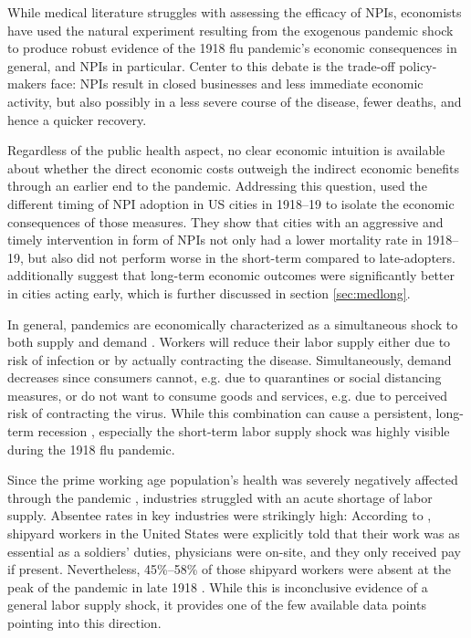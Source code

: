 \documentclass[12pt,a4paper]{article}
\begin{document}
While medical literature struggles with assessing the efficacy of NPIs, economists have used the natural experiment resulting from the exogenous pandemic shock to produce robust evidence of the 1918 flu pandemic's economic consequences in general, and NPIs in particular.
Center to this debate is the trade-off policy-makers face: NPIs result in closed businesses and less immediate economic activity, but also possibly in a less severe course of the disease, fewer deaths, and hence a quicker recovery.

Regardless of the public health aspect, no clear economic intuition is available about whether the direct economic costs outweigh the indirect economic benefits through an earlier end to the pandemic.
Addressing this question, \cite{correiaPandemicsDepressEconomy2020} used the different timing of NPI adoption in US cities in 1918--19 to isolate the economic consequences of those measures.
They show that cities with an aggressive and timely intervention in form of NPIs not only had a lower mortality rate in 1918--19, but also did not perform worse in the short-term compared to late-adopters.
\cite{correiaPandemicsDepressEconomy2020} additionally suggest that long-term economic outcomes were significantly better in cities acting early, which is further discussed in section \ref{sec:medlong}.

In general, pandemics are economically characterized as a simultaneous shock to both supply and demand \citep{eichenbaumMacroeconomicsEpidemics2020}.
Workers will reduce their labor supply either due to risk of infection or by actually contracting the disease.
Simultaneously, demand decreases since consumers cannot, e.g. due to quarantines or social distancing measures, or do not want to consume goods and services, e.g. due to perceived risk of contracting the virus.
While this combination can cause a persistent, long-term recession \citep{eichenbaumMacroeconomicsEpidemics2020}, especially the short-term labor supply shock was highly visible during the 1918 flu pandemic.

Since the prime working age population's health was severely negatively affected through the pandemic \citep{taubenberger1918InfluenzaMother2006}, industries struggled with an acute shortage of labor supply.
Absentee rates in key industries were strikingly high: According to \cite{barryPandemicsAvoidingMistakes2009}, 
shipyard workers in the United States were explicitly told that their work was as essential as a soldiers' duties, physicians were on-site, and they only received pay if present.
Nevertheless, 45\%--58\% of those shipyard workers were absent at the peak of the pandemic in late 1918 \citep{turnerReportPreventiveMeasure1919}.
While this is inconclusive evidence of a general labor supply shock, it provides one of the few available data points pointing into this direction.
\end{document}
